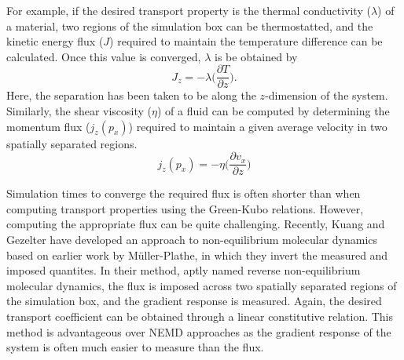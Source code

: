 For example, if the desired transport property is the thermal conductivity
($\lambda$) of a material, two regions of the simulation box can be
thermostatted, and the kinetic energy flux ($J$) required to maintain
the temperature difference can be calculated. Once this value is
converged, $\lambda$ is be obtained by
\begin{equation}\label{eq:thermalTransport}
J_{z} = - \lambda \big(\frac{\partial T}{\partial z}\big).
\end{equation}
Here, the separation has been taken to be along the $z$-dimension of
the system.  Similarly, the shear viscosity ($\eta$) of a fluid can be
computed by determining the momentum flux ($ j_{z}(p_{x})$) required
to maintain a given average velocity in two spatially separated
regions.
\begin{equation}\label{eq:momentumTransport}
  j_{z}(p_{x}) = -\eta \big(\frac{\partial v_{x}}{\partial z}\big)
\end{equation}

Simulation times to converge the required flux is often shorter than
when computing transport properties using the Green-Kubo
relations. However, computing the appropriate flux can be quite
challenging. Recently, Kuang and Gezelter have developed an approach
to non-equilibrium molecular dynamics based on earlier work by
M\"uller-Plathe, in which they invert the measured and imposed
quantites.\cite{Kuang2010,Kuang2012} In their method, aptly named
reverse non-equilibrium molecular dynamics, the flux is imposed across
two spatially separated regions of the simulation box, and the
gradient response is measured. Again, the desired transport
coefficient can be obtained through a linear constitutive
relation. This method is advantageous over NEMD approaches as the
gradient response of the system is often much easier to measure
than the flux.

